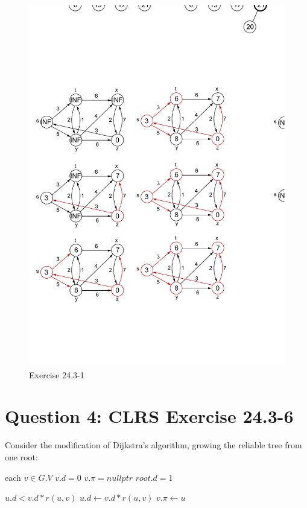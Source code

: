\documentclass[]{article}
\begin{document}
\begin{figure}
	\centering
	\includegraphics[width=\linewidth]{2431}
	\caption{Exercise 24.3-1}
	\label{fig:2431}
\end{figure}

\section{Question 4: CLRS Exercise 24.3-6}

Consider the modification of Dijkstra’s algorithm, growing the reliable tree from one root:

\begin{codebox}
	\li \For each $v \in G.V$
	\li \Do	$v.d = 0$
	\li 	$v.\pi = nullptr$ \End
	\li  $root.d = 1$
\end{codebox}

\begin{codebox}
	\li \If $u.d < v.d * r(u, v)$ 
	\li 	\Then $u.d \leftarrow v.d * r(u, v)$
	\li  		  $v.\pi \leftarrow u$ \End
\end{codebox}
\end{document}
